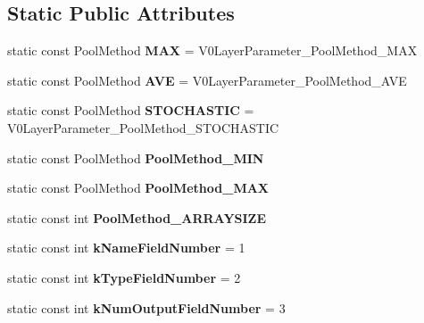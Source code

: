 \subsection*{Static Public Attributes}
\begin{DoxyCompactItemize}
\item 
\mbox{\label{classcaffe_1_1_v0_layer_parameter_a046a7152904e79772313f8651d8e6652}} 
static const Pool\+Method {\bfseries M\+AX} = V0\+Layer\+Parameter\+\_\+\+Pool\+Method\+\_\+\+M\+AX
\item 
\mbox{\label{classcaffe_1_1_v0_layer_parameter_ab650f5f5bc64c4e9ae63774d1f3ed0c6}} 
static const Pool\+Method {\bfseries A\+VE} = V0\+Layer\+Parameter\+\_\+\+Pool\+Method\+\_\+\+A\+VE
\item 
\mbox{\label{classcaffe_1_1_v0_layer_parameter_a8f9425316eef7fa173e81713ae4eb73f}} 
static const Pool\+Method {\bfseries S\+T\+O\+C\+H\+A\+S\+T\+IC} = V0\+Layer\+Parameter\+\_\+\+Pool\+Method\+\_\+\+S\+T\+O\+C\+H\+A\+S\+T\+IC
\item 
static const Pool\+Method {\bfseries Pool\+Method\+\_\+\+M\+IN}
\item 
static const Pool\+Method {\bfseries Pool\+Method\+\_\+\+M\+AX}
\item 
static const int {\bfseries Pool\+Method\+\_\+\+A\+R\+R\+A\+Y\+S\+I\+ZE}
\item 
\mbox{\label{classcaffe_1_1_v0_layer_parameter_a5ec1815f690c9edb8ff5437d4b2bef82}} 
static const int {\bfseries k\+Name\+Field\+Number} = 1
\item 
\mbox{\label{classcaffe_1_1_v0_layer_parameter_a1e1f44a0878dfdaf8e96d11c4d62044f}} 
static const int {\bfseries k\+Type\+Field\+Number} = 2
\item 
\mbox{\label{classcaffe_1_1_v0_layer_parameter_ab5a896a6ef1aa5a312bc9aa9b368b37d}} 
static const int {\bfseries k\+Num\+Output\+Field\+Number} = 3
\item 
\mbox{\label{classcaffe_1_1_v0_layer_parameter_ade4c8af4fa43cc6bde49fda5e0e19ead}} 

\end{DoxyCompactItemize}
